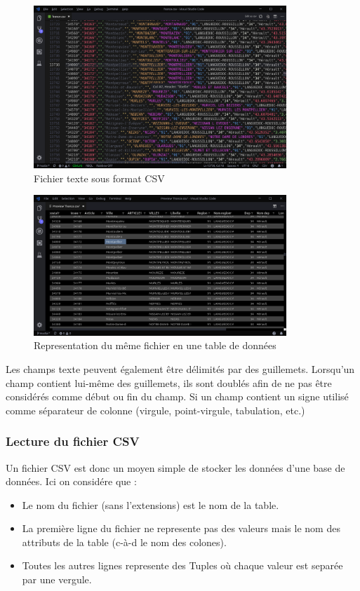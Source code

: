\documentclass[oneside,13pt,a4paper]{report}
\begin{document}
\begin{figure}[!h]
	\centering
	\includegraphics[width=0.85\textwidth]{img/csv.png}
	\caption{Fichier texte sous format CSV}
\end{figure}

\begin{figure}[!h]
	\centering
	\includegraphics[width=0.85\textwidth]{img/csv_tables.png}
	\caption{Representation du même fichier en une table de données}
\end{figure}

Les champs texte peuvent également être délimités par des guillemets. Lorsqu'un champ contient lui-même des guillemets, ils sont doublés afin de ne pas être considérés comme début ou fin du champ. 
Si un champ contient un signe utilisé comme séparateur de colonne (virgule, point-virgule, tabulation, etc.)

\subsubsection{Lecture du fichier CSV}

Un fichier CSV est donc un moyen simple de stocker les données d'une base de données.
Ici on considére que :
\begin{itemize}
	\item Le nom du fichier (sans l'extensions) est le nom de la table.
	\item La première ligne du fichier ne represente pas des valeurs mais le nom des attributs de la table (c-à-d le nom des colones).
	\item Toutes les autres lignes represente des Tuples où chaque valeur est separée par une vergule.
\end{itemize}
\vspace{0.3cm}
\end{document}
